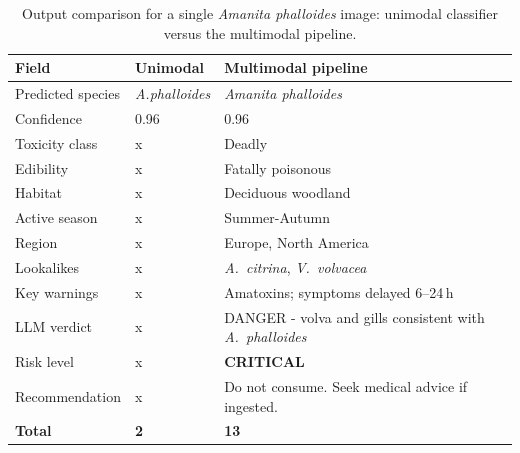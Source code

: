 \documentclass[journal,transmag]{IEEEtran}
\begin{document}
\begin{table}[h!]
\centering
\caption{Output comparison for a single \textit{Amanita phalloides}
         image: unimodal classifier versus the multimodal pipeline.}
\label{tab:output-comparison}
\normalsize
\begin{tabular}{p{2.1cm} p{1.6cm} p{4.2cm}}
\hline
\textbf{Field} & \textbf{Unimodal} & \textbf{Multimodal pipeline} \\
\hline
Predicted species  & \textit{A.phalloides} & \textit{Amanita phalloides}                      \\[3pt]
Confidence         & 0.96                   & 0.96                                             \\[3pt]
Toxicity class     & x                     & Deadly                                           \\[3pt]
Edibility          & x                     & Fatally poisonous                                \\[3pt]
Habitat            & x                     & Deciduous woodland                               \\[3pt]
Active season      & x                     & Summer-Autumn                                   \\[3pt]
Region             & x                     & Europe, North America                            \\[3pt]
Lookalikes         & x                     & \textit{A.~citrina}, \textit{V.~volvacea}        \\[3pt]
Key warnings       & x                     & Amatoxins; symptoms delayed 6--24\,h             \\[3pt]
LLM verdict        & x                     & DANGER - volva and gills consistent with
                                                   \textit{A.~phalloides}                         \\[3pt]
Risk level         & x                     & \textbf{CRITICAL}                                \\[3pt]
Recommendation     & x                     & Do not consume. Seek medical advice if ingested. \\
\hline
\textbf{Total}     & \textbf{2}             & \textbf{13}                                      \\
\hline
\end{tabular}
\end{table}
  
\end{document}
